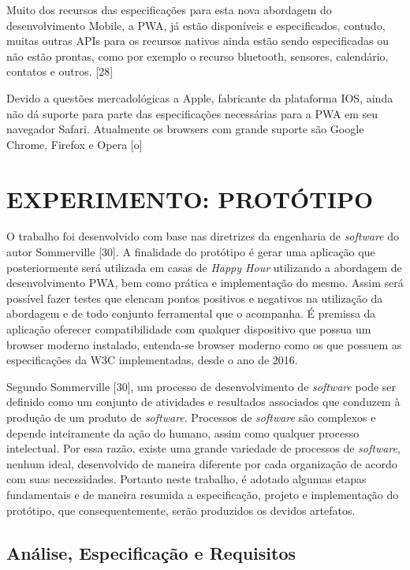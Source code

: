 Muito dos recursos das especificações para esta nova abordagem do desenvolvimento Mobile, a PWA, já estão disponíveis e especificados, contudo, muitas outras APIs para os recursos nativos ainda estão sendo especificadas ou não estão prontas, como por exemplo o recurso bluetooth, sensores, calendário, contatos e outros. [28]

Devido a questões mercadológicas a Apple, fabricante da plataforma IOS, ainda não dá suporte para parte das especificações necessárias para a PWA em seu navegador Safari. Atualmente os browsers com grande suporte são Google Chrome, Firefox e Opera [o]

\section{\esp EXPERIMENTO: PROTÓTIPO}

O trabalho foi desenvolvido com base nas diretrizes da engenharia de \textit{software} do autor Sommerville [30]. A finalidade  do protótipo é gerar uma aplicação que posteriormente será utilizada em casas de \textit{Happy Hour} utilizando a abordagem de desenvolvimento PWA, bem como prática e implementação do mesmo. Assim será possível fazer testes que elencam pontos positivos e negativos na utilização da abordagem e de todo conjunto ferramental que o acompanha. É premissa da aplicação oferecer compatibilidade com qualquer dispositivo que possua um browser moderno instalado, entenda-se browser moderno como os que possuem as especificações da W3C implementadas, desde o ano de 2016.

Segundo Sommerville [30], um processo de desenvolvimento de \textit{software} pode ser definido como um conjunto de atividades e resultados associados que conduzem à produção de um produto de \textit{software}. Processos de \textit{software} são complexos e depende inteiramente da ação do humano, assim como qualquer processo intelectual. Por essa razão, existe uma grande variedade de processos de \textit{software}, nenhum ideal, desenvolvido de maneira diferente por cada organização de acordo com suas necessidades. Portanto neste trabalho, é adotado algumas etapas fundamentais e de maneira resumida a especificação, projeto e implementação do protótipo, que consequentemente, serão produzidos os devidos artefatos.

\subsection{\esp Análise, Especificação e Requisitos}

